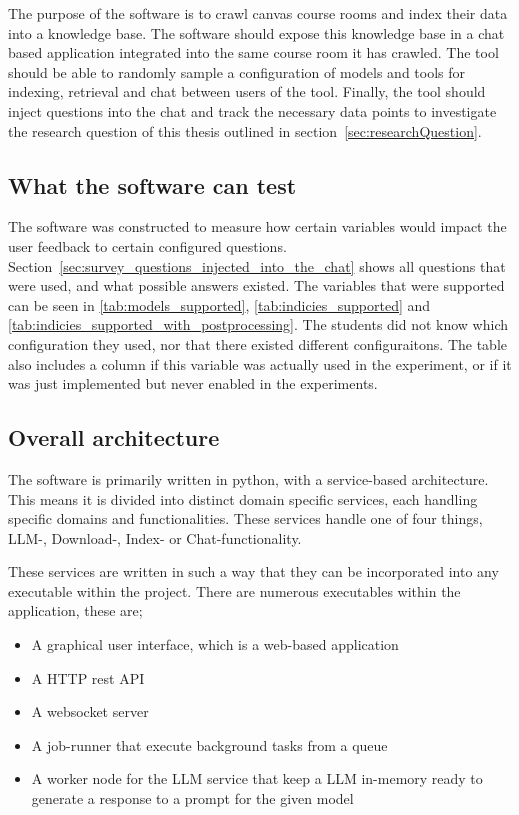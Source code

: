 The purpose of the software is to crawl canvas course rooms and index their data into a knowledge base. The software should expose this knowledge base in a chat based application integrated into the same course room it has crawled. The tool should be able to randomly sample a configuration of models and tools for indexing, retrieval and chat between users of the tool. Finally, the tool should inject questions into the chat and track the necessary data points to investigate the research question of this thesis outlined in section~\ref{sec:researchQuestion}.


\subsection{What the software can test}


The software was constructed to measure how certain variables would impact the user feedback to certain configured questions. Section~\ref{sec:survey_questions_injected_into_the_chat} shows all questions that were used, and what possible answers existed. The variables that were supported can be seen in \autoref{tab:models_supported}, \autoref{tab:indicies_supported} and \autoref{tab:indicies_supported_with_postprocessing}. The students did not know which configuration they used, nor that there existed different configuraitons. The table also includes a column if this variable was actually used in the experiment, or if it was just implemented but never enabled in the experiments.





\subsection{Overall architecture}


The software is primarily written in python, with a service-based architecture. This means it is divided into distinct domain specific services, each handling specific domains and functionalities. These services handle one of four things, \gls{LLM}-, Download-, Index- or Chat-functionality.


These services are written in such a way that they can be incorporated into any executable within the project. There are numerous executables within the application, these are;


\begin{itemize}
        \item A graphical user interface, which is a web-based application
        \item A HTTP rest API
        \item A websocket server
        \item A job-runner that execute background tasks from a queue
        \item A worker node for the \gls{LLM} service that keep a \gls{LLM} in-memory ready to generate a response to a prompt for the given model
\end{itemize}


